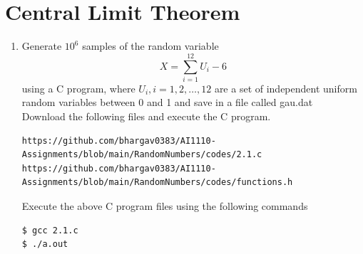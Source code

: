 \documentclass[journal,12pt,twocolumn]{IEEEtran}
\begin{document}
\section{Central Limit Theorem}
%
\begin{enumerate}[label=\thesection.\arabic*
,ref=\thesection.\theenumi]
%
\item
Generate $10^6$ samples of the random variable
%
\begin{equation}
X = \sum_{i=1}^{12}U_i -6
\end{equation}
%
using a C program, where $U_i, i = 1,2,\dots, 12$ are  a set of independent uniform random variables between 0 and 1 and save in a file called gau.dat\\
\solution Download the following files and execute the  C program.
\begin{lstlisting}
https://github.com/bhargav0383/AI1110-Assignments/blob/main/RandomNumbers/codes/2.1.c
https://github.com/bhargav0383/AI1110-Assignments/blob/main/RandomNumbers/codes/functions.h
\end{lstlisting}
Execute the above C program files using the following commands
\begin{lstlisting}
$ gcc 2.1.c
$ ./a.out
\end{lstlisting}


\end{enumerate}
\end{document}
